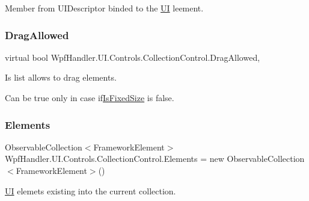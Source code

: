 Member from U\+I\+Descriptor binded to the \mbox{\hyperlink{namespace_wpf_handler_1_1_u_i}{UI}} leement. 

\mbox{\label{class_wpf_handler_1_1_u_i_1_1_controls_1_1_collection_control_a93748b307999d44bfa539f0a799af1de}} 
\subsubsection{\texorpdfstring{Drag\+Allowed}{DragAllowed}}
{\footnotesize\ttfamily virtual bool Wpf\+Handler.\+U\+I.\+Controls.\+Collection\+Control.\+Drag\+Allowed\hspace{0.3cm}{\ttfamily [get]}, {\ttfamily [set]}}



Is list allows to drag elements. 

Can be true only in case if\mbox{\hyperlink{class_wpf_handler_1_1_u_i_1_1_controls_1_1_collection_control_aa95fcae30ed2356bfff8154bcceecc8a}{Is\+Fixed\+Size}} is false. \mbox{\label{class_wpf_handler_1_1_u_i_1_1_controls_1_1_collection_control_ade5772e31978f3f8764f50d7483d27f4}} 
\subsubsection{\texorpdfstring{Elements}{Elements}}
{\footnotesize\ttfamily Observable\+Collection$<$Framework\+Element$>$ Wpf\+Handler.\+U\+I.\+Controls.\+Collection\+Control.\+Elements = new Observable\+Collection$<$Framework\+Element$>$()\hspace{0.3cm}{\ttfamily [get]}}



\mbox{\hyperlink{namespace_wpf_handler_1_1_u_i}{UI}} elemets existing into the current collection. 

